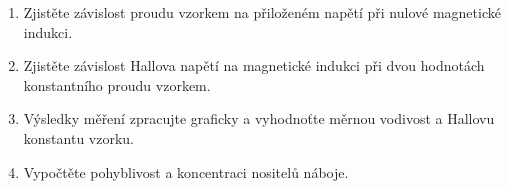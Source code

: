 \documentclass[0-protokol.tex]{subfiles}
\begin{document}
\begin{enumerate}
\item Zjistěte závislost proudu vzorkem na přiloženém napětí při nulové magnetické indukci.
\item Zjistěte závislost Hallova napětí na magnetické indukci při dvou hodnotách konstantního proudu vzorkem.
\item Výsledky měření zpracujte graficky a vyhodnoťte měrnou vodivost a Hallovu konstantu vzorku.
\item Vypočtěte pohyblivost a koncentraci nositelů náboje.
\end{enumerate}
\end{document}
